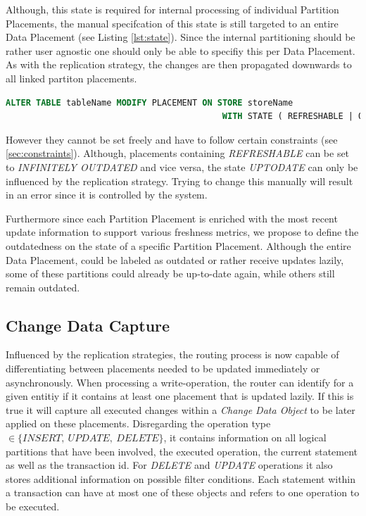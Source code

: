 Although, this state is required for internal processing of individual Partition Placements, the manual specifcation of this state is still 
targeted to an entire Data Placement (see Listing \ref{lst:state}).
Since the internal partitioning should be rather user agnostic one should only be able to specifiy this per Data Placement. 
As with the replication strategy, the changes are then propagated downwards to all linked partiton placements.

\begin{lstlisting}[language=sql, caption={SQL Statement Syntax to change the designated Replication State of Data Placement.},label={lst:state}]
    ALTER TABLE tableName MODIFY PLACEMENT ON STORE storeName 
                                           WITH STATE ( REFRESHABLE | OUTDATED );
\end{lstlisting}

However they cannot be set freely and have to follow certain constraints (see \ref{sec:constraints}).
Although, placements containing \emph{REFRESHABLE} can be set to \emph{INFINITELY OUTDATED} and vice versa, the state \emph{UPTODATE} can only be influenced by the replication strategy.
Trying to change this manually will result in an error since it is controlled by the system.



Furthermore since each Partition Placement is enriched with the most recent update information to support various freshness metrics,
we propose to define the outdatedness on the state of a specific Partition Placement.
Although the entire Data Placement, could be labeled as outdated or rather receive updates lazily, some of 
these partitions could already be up-to-date again, while others still remain outdated.



\subsection{Change Data Capture}
\label{sec:cdc_impl}

Influenced by the replication strategies, the routing process is now capable of differentiating between placements needed to be updated immediately or asynchronously. 
When processing a write-operation, the router can identify for a given entitiy if it contains at least one placement that is updated lazily.
If this is true it will capture all executed changes within a \emph{Change Data Object} to be later applied on these placements. 
Disregarding the operation type $\in \{INSERT,\:UPDATE,\:DELETE\}$, it contains information on all logical partitions that have been involved, 
the executed operation, the current statement as well as the transaction id. For \emph{DELETE} and \emph{UPDATE} operations it also stores additional information on possible filter 
conditions. Each statement within a transaction can have at most one of these objects and refers to one operation to be executed.

